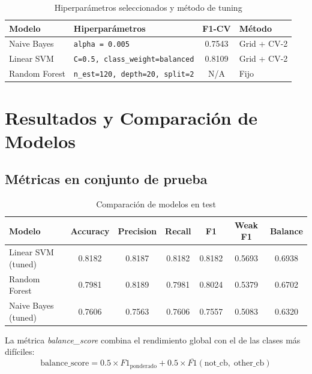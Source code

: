 ﻿\documentclass[12pt,a4paper]{article}
\begin{document}
\begin{table}[H]
\centering
\caption{Hiperparámetros seleccionados y método de tuning}
\label{tab:hyperparams}
\begin{tabular}{p{3.0cm} p{5.5cm} c p{2.5cm}}
\toprule
Modelo & Hiperparámetros & F1-CV & Método \\
\midrule
Naive Bayes   & \texttt{alpha = 0.005}                     & 0.7543 & Grid + CV-2 \\
Linear SVM    & \texttt{C=0.5, class\_weight=balanced}      & 0.8109 & Grid + CV-2 \\
Random Forest & \texttt{n\_est=120, depth=20, split=2}      & N/A    & Fijo \\
\bottomrule
\end{tabular}
\end{table}

\section{Resultados y Comparación de Modelos}

\subsection{Métricas en conjunto de prueba}

\begin{table}[H]
\centering
\caption{Comparación de modelos en test}
\label{tab:model_comp}
\begin{tabular}{lcccccc}
\toprule
Modelo & Accuracy & Precision & Recall & F1 & Weak F1 & Balance \\
\midrule
Linear SVM (tuned)    & 0.8182 & 0.8187 & 0.8182 & 0.8182 & 0.5693 & 0.6938 \\
Random Forest         & 0.7981 & 0.8189 & 0.7981 & 0.8024 & 0.5379 & 0.6702 \\
Naive Bayes (tuned)   & 0.7606 & 0.7563 & 0.7606 & 0.7557 & 0.5083 & 0.6320 \\
\bottomrule
\end{tabular}
\end{table}

La métrica \textit{balance\_score} combina el rendimiento global con
el de las clases más difíciles:
\[
  \text{balance\_score} = 0.5 \times F1_{\text{ponderado}}
  + 0.5 \times \overline{F1}(\text{not\_cb},\; \text{other\_cb})
\]
\end{document}
